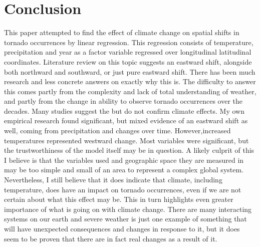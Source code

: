 \documentclass[12pt,english]{article}
\begin{document}
\section{Conclusion}\label{sec:conclusion}
\hspace{1cm} This paper attempted to find the effect of climate change on spatial shifts in tornado occurrences by linear regression. This regression consists of temperature, precipitation and year as a factor variable regressed over longitudinal latitudinal coordinates. Literature review on this topic suggests an eastward shift, alongside both northward and southward, or just pure eastward shift. There has been much research and less concrete answers on exactly why this is. The difficulty to answer this comes partly from the complexity and lack of total understanding of weather, and partly from the change in ability to observe tornado occurrences over the decades. Many studies suggest the but do not confirm climate effects. My own empirical research found significant, but mixed evidence of an eastward shift as well, coming from precipitation and changes over time. However,increased temperatures represented westward change. Most variables were significant, but the trustworthiness of the model itself may be in question. A likely culprit of this I believe is that the variables used and geographic space they are measured in may be too simple and small of an area to represent a complex global system. Nevertheless, I still believe that it does indicate that climate, including temperature, does have an impact on tornado occurrences, even if we are not certain about what this effect may be. This in turn highlights even greater importance of what is going on with climate change. There are many interacting systems on our earth and severe weather is just one example of something that will have unexpected consequences and changes in response to it, but it does seem to be proven that there are in fact real changes as a result of it.  

\newpage


\section{}
 

\newpage
\end{document}
